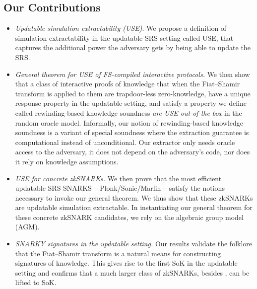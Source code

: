 \subsection{Our Contributions}
\begin{itemize}
\item 
\emph{Updatable simulation extractability (USE)}. 
We propose a definition of simulation extractability in the updatable SRS setting called USE, that captures the additional power the adversary gets by being able to update the SRS.%
    
  \item \emph{General theorem for USE of FS-compiled interactive protocols.} We
        then show that a class of interactive proofs of knowledge that when
        the Fiat--Shamir transform is applied to them are trapdoor-less zero-knowledge, have a
        unique response property in the updatable setting, and satisfy a
        property we define called rewinding-based
        knowledge soundness \emph{are USE
        out-of-the box} in the random oracle model. Informally, our notion of rewinding-based knowledge soundness is a variant of special soundness where 
        the extraction guarantee is computational
        instead of unconditional. Our extractor only needs oracle access to the
        adversary, it does not depend on the adversary’s code, nor does it rely on
        knowledge assumptions.
    
\item
\emph{USE for concrete zkSNARKs.}
We then prove that the most efficient updatable SRS SNARKS -- Plonk/Sonic/Marlin -- satisfy the notions necessary to invoke our general theorem. We thus show that these zkSNARKs are updatable simulation extractable.
In instantiating our general theorem for these concrete zkSNARK candidates, we rely on the algebraic group model (AGM).

\item
  \emph{SNARKY signatures in the updatable setting.} Our results validate the folklore that the Fiat--Shamir transform is a natural means for constructing signatures of knowledge. This gives rise to the first SoK in the updatable setting and confirms that a much larger class of zkSNARKs, besides \cite{C:GroMal17}, can be lifted to SoK.
	
\end{itemize}



